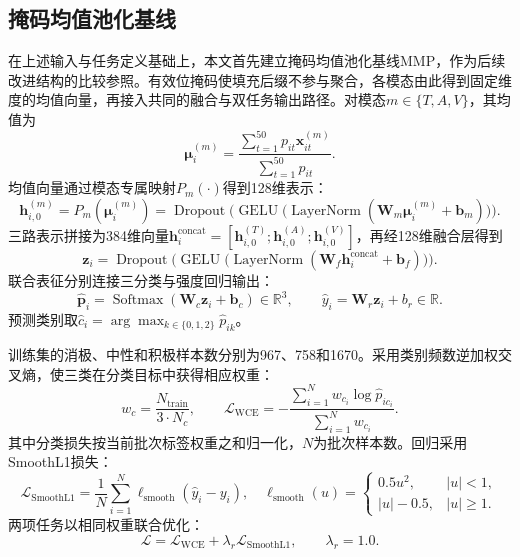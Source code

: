 \documentclass[UTF8,a4paper,11pt]{ctexart}
\newcommand{\QTwoParagraph}{\par\noindent\hspace*{2em}}
\newcounter{q2algorithm}
\begin{document}
\subsection{掩码均值池化基线}\label{subsec:q2_base}
\QTwoParagraph 在上述输入与任务定义基础上，本文首先建立掩码均值池化基线MMP，作为后续改进结构的比较参照。有效位掩码使填充后缀不参与聚合，各模态由此得到固定维度的均值向量，再接入共同的融合与双任务输出路径。对模态$m\in\{T,A,V\}$，其均值为
\begin{equation}
\boldsymbol\mu_i^{(m)} = \frac{\sum_{t=1}^{50} p_{it} \mathbf x_{it}^{(m)}}{\sum_{t=1}^{50} p_{it}}.
\label{eq:q2_mean_pool}
\end{equation}
均值向量通过模态专属映射$P_m(\cdot)$得到128维表示：
\begin{equation}
\mathbf h_{i,0}^{(m)} = P_m\left(\boldsymbol\mu_i^{(m)}\right) = \operatorname{Dropout}\Big(\operatorname{GELU}\big(\operatorname{LayerNorm}(\mathbf W_m \boldsymbol\mu_i^{(m)} + \mathbf b_m)\big)\Big).
\label{eq:q2_proj_layer}
\end{equation}
三路表示拼接为384维向量$\mathbf h_i^{\mathrm{concat}}=[\mathbf h_{i,0}^{(T)};\mathbf h_{i,0}^{(A)};\mathbf h_{i,0}^{(V)}]$，再经128维融合层得到
\begin{equation}
\mathbf z_i = \operatorname{Dropout}\Big(\operatorname{GELU}\big(\operatorname{LayerNorm}(\mathbf W_f \mathbf h_i^{\mathrm{concat}} + \mathbf b_f)\big)\Big).
\end{equation}
联合表征分别连接三分类与强度回归输出：
\begin{equation}
\hat{\mathbf p}_i = \operatorname{Softmax}(\mathbf W_c \mathbf z_i + \mathbf b_c) \in \mathbb R^3,\qquad
\hat y_i = \mathbf W_r \mathbf z_i + b_r \in \mathbb R.
\label{eq:q2_heads}
\end{equation}
预测类别取$\hat c_i=\arg\max_{k\in\{0,1,2\}}\hat p_{ik}$。

\QTwoParagraph 训练集的消极、中性和积极样本数分别为967、758和1670。采用类别频数逆加权交叉熵，使三类在分类目标中获得相应权重：
\begin{equation}
w_c = \frac{N_{\mathrm{train}}}{3 \cdot N_c},\qquad
\mathcal L_{\mathrm{WCE}} = -\frac{\sum_{i=1}^N w_{c_i}\log\hat p_{i c_i}}{\sum_{i=1}^N w_{c_i}}.
\end{equation}
其中分类损失按当前批次标签权重之和归一化，$N$为批次样本数。回归采用SmoothL1损失：
\begin{equation}
\mathcal L_{\mathrm{SmoothL1}} = \frac{1}{N}\sum_{i=1}^N \ell_{\mathrm{smooth}}(\hat y_i - y_i),\quad
\ell_{\mathrm{smooth}}(u) = \begin{cases}
0.5 u^2, & |u| < 1,\\
|u| - 0.5, & |u| \ge 1.
\end{cases}
\end{equation}
两项任务以相同权重联合优化：
\begin{equation}
\mathcal L = \mathcal L_{\mathrm{WCE}} + \lambda_r \mathcal L_{\mathrm{SmoothL1}},\qquad \lambda_r = 1.0.
\label{eq:q2_loss_full}
\end{equation}
\end{document}
